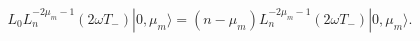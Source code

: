 \begin{equation}
	L_{0} L_{n}^{-2\mu_{m}-1}(2\omega T_{-})|0,\mu_{m}\rangle =
	(n-\mu_{m}) L_{n}^{-2\mu_{m}-1}(2\omega T_{-})|0,\mu_{m}\rangle .
\end{equation}

